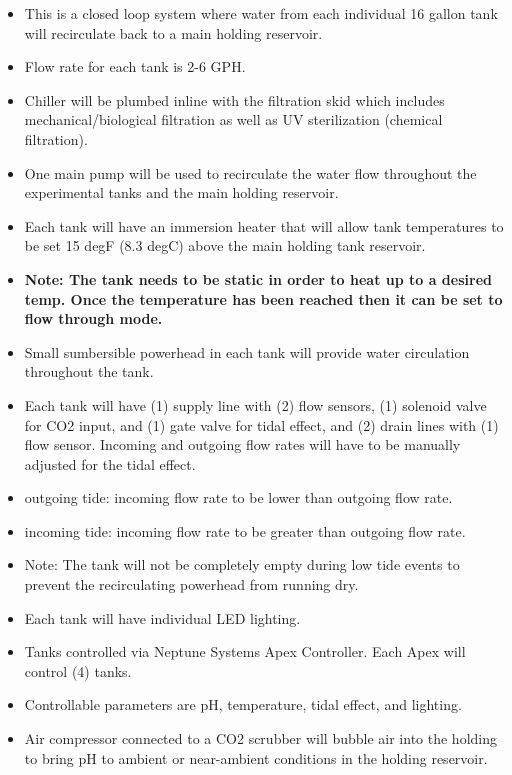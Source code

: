 \documentclass[]{book}
\providecommand{\tightlist}{%
  \setlength{\itemsep}{0pt}\setlength{\parskip}{0pt}}
\begin{document}
\begin{itemize}
\tightlist
\item
  This is a closed loop system where water from each individual 16
  gallon tank will recirculate back to a main holding reservoir.\\
\item
  Flow rate for each tank is 2-6 GPH.\\
\item
  Chiller will be plumbed inline with the filtration skid which includes
  mechanical/biological filtration as well as UV sterilization (chemical
  filtration).\\
\item
  One main pump will be used to recirculate the water flow throughout
  the experimental tanks and the main holding reservoir.\\
\item
  Each tank will have an immersion heater that will allow tank
  temperatures to be set 15 degF (8.3 degC) above the main holding tank
  reservoir.\\
\item
  \textbf{Note: The tank needs to be static in order to heat up to a
  desired temp. Once the temperature has been reached then it can be set
  to flow through mode.}\\
\item
  Small sumbersible powerhead in each tank will provide water
  circulation throughout the tank.\\
\item
  Each tank will have (1) supply line with (2) flow sensors, (1)
  solenoid valve for CO2 input, and (1) gate valve for tidal effect, and
  (2) drain lines with (1) flow sensor. Incoming and outgoing flow rates
  will have to be manually adjusted for the tidal effect.\\
\item
  outgoing tide: incoming flow rate to be lower than outgoing flow
  rate.\\
\item
  incoming tide: incoming flow rate to be greater than outgoing flow
  rate.\\
\item
  Note: The tank will not be completely empty during low tide events to
  prevent the recirculating powerhead from running dry.\\
\item
  Each tank will have individual LED lighting.\\
\item
  Tanks controlled via Neptune Systems Apex Controller. Each Apex will
  control (4) tanks.\\
\item
  Controllable parameters are pH, temperature, tidal effect, and
  lighting.\\
\item
  Air compressor connected to a CO2 scrubber will bubble air into the
  holding to bring pH to ambient or near-ambient conditions in the
  holding reservoir.
\end{itemize}
\end{document}
